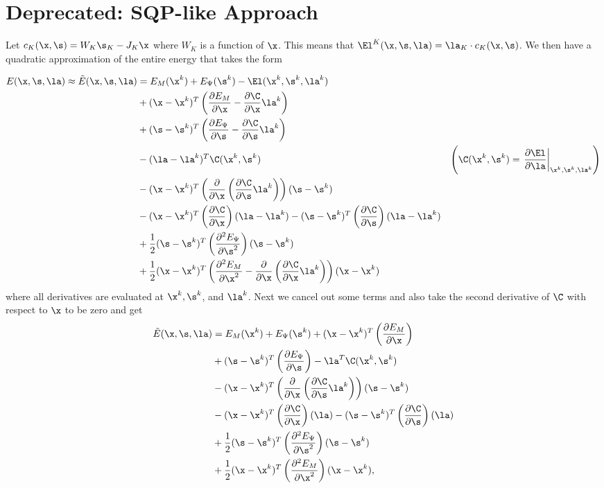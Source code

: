 \section{Deprecated: SQP-like Approach}
Let $c_K(\x,\s) = W_K \s_K - J_K \x$ where $W_K$ is a function of $\x$. This means that $\El^K(\x,\s,\la) = \la_K \cdot c_K(\x,\s)$. We then have a quadratic approximation of the entire energy that takes the form

\begin{align*}
E(\x,\s,\la) \approx \tilde{E}(\x,\s,\la) &= E_M(\x^k) + E_\Psi(\s^k) - \El(\x^k,\s^k,\la^k) \\
&+ 
(\x - \x^k)^T \left(
	\frac{\partial E_M}{\partial \x} 
 -  \frac{\partial \C}{\partial \x} \la^k \right) & \\
&+ (\s - \s^k)^T \left(
	\frac{\partial E_\Psi}{\partial \s} 
 -  \frac{\partial \C}{\partial \s} \la^k \right)  & \\
&- (\la - \la^k)^T \C (\x^k, \s^k) & \left(\C (\x^k,\s^k) = \left. \frac{\partial \El}{\partial \la} \right|_{\x^k,\s^k,\la^k}\right) \\
& - (\x - \x^k)^T \left(
  \frac{\partial}{\partial \x} \left(\frac{\partial \C}{\partial \s} \la^k\right) \right)(\s - \s^k) & \\
& - (\x - \x^k)^T \left(
  \frac{\partial \C }{\partial \x} \right)(\la - \la^k) 
- (\s - \s^k)^T \left(
  \frac{\partial \C }{\partial \s} \right)(\la - \la^k) & \\
& + \frac{1}{2} (\s- \s^k)^T \left(\frac{\partial^2 E_\Psi}{\partial \s^2} \right)(\s - \s^k) & \\
& + \frac{1}{2}(\x- \x^k)^T \left(\frac{\partial^2 E_M}{\partial \x^2} -
\frac{\partial}{\partial \x} \left(\frac{\partial \C}{\partial \x} \la^k\right)
\right)(\x - \x^k) & \\
\end{align*}
where all derivatives are evaluated at $\x^k, \s^k$, and $\la^k$. Next we cancel out some terms and also take the second derivative of $\C$ with respect to $\x$ to be zero and get
\begin{equation}
\begin{split}
\tilde{E}(\x,\s,\la) &=  E_M(\x^k) + E_\Psi(\s^k) + 
(\x - \x^k)^T \left(\frac{\partial E_M}{\partial \x} \right)  \\
&+ (\s - \s^k)^T \left(\frac{\partial E_\Psi}{\partial \s} \right)   
 - \la^T \C (\x^k, \s^k) \\
& - (\x - \x^k)^T \left(
  \frac{\partial}{\partial \x} \left(\frac{\partial \C}{\partial \s} \la^k\right) \right)(\s - \s^k) \\
& - (\x - \x^k)^T \left(
  \frac{\partial \C }{\partial \x} \right)(\la) 
- (\s - \s^k)^T \left(
  \frac{\partial \C }{\partial \s} \right)(\la) \\
& + \frac{1}{2}(\s- \s^k)^T \left(\frac{\partial^2 E_\Psi}{\partial \s^2} \right)(\s - \s^k) \\
& + \frac{1}{2}(\x- \x^k)^T \left(\frac{\partial^2 E_M}{\partial \x^2}
\right)(\x - \x^k), \\
\end{split}
\end{equation}
